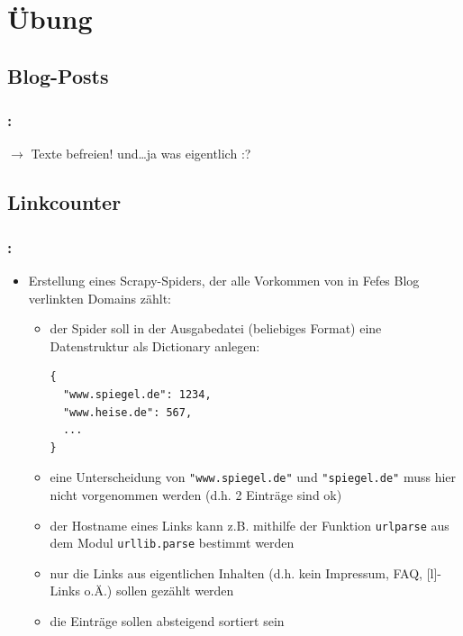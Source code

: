 \documentclass{beamer}
\begin{document}

\section{Übung}





\subsection{Blog-Posts}
\begin{frame}
	\frametitle{\insertsection{}: \insertsubsection{}}	
	$\rightarrow$ Texte befreien! und\ldots ja was eigentlich :?
\end{frame}



\subsection{Linkcounter}
\begin{frame}[fragile]
	\frametitle{\insertsection{}: \insertsubsection{}}
	\begin{itemize}
		\item Erstellung eines Scrapy-Spiders, der alle Vorkommen von in Fefes Blog
		verlinkten Domains zählt: \begin{itemize}
			\item der Spider soll in der Ausgabedatei (beliebiges Format) eine Datenstruktur als Dictionary anlegen: \begin{lstlisting} 
{
  "www.spiegel.de": 1234,
  "www.heise.de": 567,
  ...
}
			\end{lstlisting}
		\item eine Unterscheidung von \lstinline|"www.spiegel.de"| und \lstinline|"spiegel.de"| muss hier nicht vorgenommen werden (d.h. 2 Einträge sind ok)
		\item der Hostname eines Links kann z.B. mithilfe der Funktion \lstinline|urlparse| aus dem Modul \lstinline|urllib.parse| bestimmt werden
		\item nur die Links aus eigentlichen Inhalten (d.h. kein Impressum, FAQ,
		[l]-Links o.Ä.) sollen gezählt werden
		\item die Einträge sollen absteigend sortiert sein
		\end{itemize}
	\end{itemize}
\end{frame}
\end{document}
